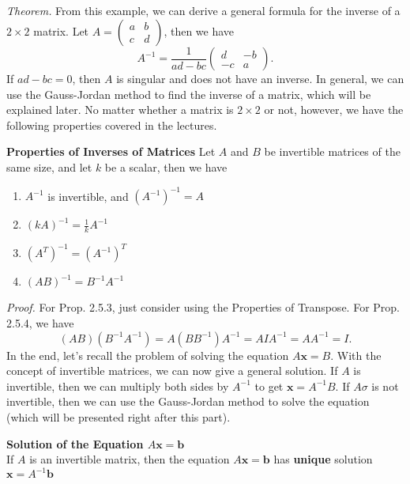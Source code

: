 \documentclass[10pt, a4paper]{article}
\begin{document}
\textit{Theorem.} From this example, we can derive a general formula for the inverse of a $2\times 2$ matrix. Let $A = \begin{pmatrix} a & b \\ c & d \end{pmatrix}$, then we have $$A^{-1} = \frac{1}{ad-bc}\begin{pmatrix} d & -b \\ -c & a \end{pmatrix}.$$ 
If $ad-bc=0$, then $A$ is singular and does not have an inverse. In general, we can use the Gauss-Jordan method to find the inverse of a matrix, which will be explained later.
No matter whether a matrix is $2 \times 2$ or not, however, we have the following properties covered in the lectures.
\begin{proposition}
    \textbf{Properties of Inverses of Matrices}
    Let $A$ and $B$ be invertible matrices of the same size, and let $k$ be a scalar, then we have
    \begin{enumerate}
        \item $A^{-1}$ is invertible, and $(A^{-1})^{-1} = A$
        \item $(kA)^{-1} = \frac{1}{k}A^{-1}$
        \item $(A^T)^{-1} = (A^{-1})^T$
        \item $(AB)^{-1} = B^{-1}A^{-1}$
    \end{enumerate}
\end{proposition}
\textit{Proof.} For Prop. 2.5.3, just consider using the Properties of Transpose. For Prop. 2.5.4, we have $$(AB)(B^{-1}A^{-1}) = A(BB^{-1})A^{-1} = AIA^{-1} = AA^{-1} = I.$$
\; \; \;In the end, let's recall the problem of solving the equation $A\mathbf{x} = B$. With the concept of invertible matrices, we can now give a general solution. If $A$ is invertible, then we can multiply both sides by $A^{-1}$ to get $\mathbf{x} = A^{-1}B$. If $A\sigma $ is not invertible, then we can use the Gauss-Jordan method to solve the equation (which will be presented right after this part).
\begin{proposition}
    \textbf{Solution of the Equation $A\mathbf{x} = \mathbf{b}$}\\
    If $A$ is an invertible matrix, then the equation $A\mathbf{x} = \mathbf{b}$ has \textbf{unique} solution $\mathbf{x} = A^{-1} \mathbf{b}$
\end{proposition}
\end{document}

